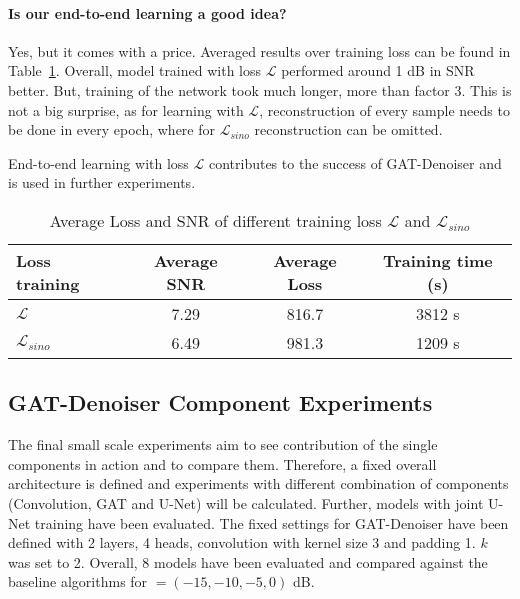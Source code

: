 \paragraph{Is our end-to-end learning a good idea?}
Yes, but it comes with a price. 
Averaged results over training loss can be found in Table~\ref{tab:loss_sino_reco}. 
Overall, model trained with loss $\mathcal{L} $ performed around 1 dB in SNR better.
But, training of the network took much longer, more than factor 3. 
This is not a big surprise, as for learning with $\mathcal{L} $, reconstruction of every sample
needs to be done in every epoch, where for $\mathcal{L}_{sino}$ reconstruction can be omitted.

\begin{tcolorbox}[colback=red!5!white,colframe=red!75!black]
  End-to-end learning with loss $\mathcal{L} $ contributes to the success of GAT-Denoiser and 
   is used in further experiments.
\end{tcolorbox}


\begin{table}[H]
  \centering
    \begin{tabular}{l|ccc}
    \toprule
    \textbf{Loss training} & \textbf{Average SNR} & \textbf{Average Loss} & \textbf{Training time (s)}  \\ 
    \midrule
    $\mathcal{L} $         &  7.29    &  816.7  & 3812 s \\ \hline
    $\mathcal{L}_{sino}$   &  6.49    &  981.3  & 1209 s \\ \hline
    \midrule
    \end{tabular}
  \caption{Average Loss and SNR of different training loss $\mathcal{L}$ and $\mathcal{L}_{sino}$}
  \label{tab:loss_sino_reco}
\end{table}


\subsection{GAT-Denoiser Component Experiments}

The final small scale experiments aim to see contribution of the single components in action and 
to compare them.
Therefore, a fixed overall architecture is defined and experiments
with different combination of components (Convolution, GAT and U-Net) will be calculated.
Further, models with joint U-Net training have been evaluated.
The fixed settings for GAT-Denoiser have been defined with 2 layers, 4 heads, convolution with 
kernel size 3 and padding 1. $k$ was set to 2.
Overall, 8 models have been evaluated and compared against the baseline algorithms for  \snry $ = (-15,-10,-5,0) $ dB.

